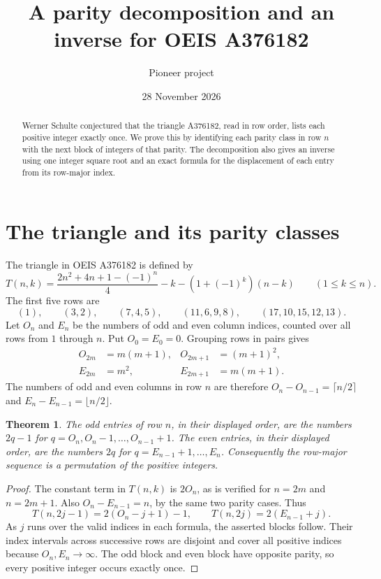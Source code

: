 \documentclass[11pt]{article}
\title{A parity decomposition and an inverse for OEIS A376182}
\author{Pioneer project}
\date{28 November 2026}
\newtheorem{theorem}{Theorem}
\begin{document}
\maketitle
\begin{abstract}
Werner Schulte conjectured that the triangle A376182, read in row order, lists each positive integer exactly once. We prove this by identifying each parity class in row \(n\) with the next block of integers of that parity. The decomposition also gives an inverse using one integer square root and an exact formula for the displacement of each entry from its row-major index.
\end{abstract}

\section{The triangle and its parity classes}

The triangle in OEIS A376182 \cite{triangle} is defined by
\[
 T(n,k)=\frac{2n^2+4n+1-(-1)^n}{4}-k
        -(1+(-1)^k)(n-k)
 \qquad(1\le k\le n).
\]
The first five rows are
\[
 (1),\qquad (3,2),\qquad (7,4,5),\qquad
 (11,6,9,8),\qquad (17,10,15,12,13).
\]
Let \(O_n\) and \(E_n\) be the numbers of odd and even column indices, counted over all rows from \(1\) through \(n\). Put \(O_0=E_0=0\). Grouping rows in pairs gives
\begin{align*}
O_{2m}&=m(m+1), & O_{2m+1}&=(m+1)^2,\\
E_{2m}&=m^2,    & E_{2m+1}&=m(m+1).
\end{align*}
The numbers of odd and even columns in row \(n\) are therefore \(O_n-O_{n-1}=\lceil n/2\rceil\) and \(E_n-E_{n-1}=\lfloor n/2\rfloor\).

\begin{theorem}\label{thm:block}
The odd entries of row \(n\), in their displayed order, are the numbers \(2q-1\) for \(q=O_n,O_n-1,\ldots,O_{n-1}+1\). The even entries, in their displayed order, are the numbers \(2q\) for \(q=E_{n-1}+1,\ldots,E_n\). Consequently the row-major sequence is a permutation of the positive integers.
\end{theorem}

\begin{proof}
The constant term in \(T(n,k)\) is \(2O_n\), as is verified for \(n=2m\) and \(n=2m+1\). Also \(O_n-E_{n-1}=n\), by the same two parity cases. Thus
\[
 T(n,2j-1)=2(O_n-j+1)-1,\qquad
 T(n,2j)=2(E_{n-1}+j).
\]
As \(j\) runs over the valid indices in each formula, the asserted blocks follow. Their index intervals across successive rows are disjoint and cover all positive indices because \(O_n,E_n\to\infty\). The odd block and even block have opposite parity, so every positive integer occurs exactly once.
\end{proof}
\end{document}
